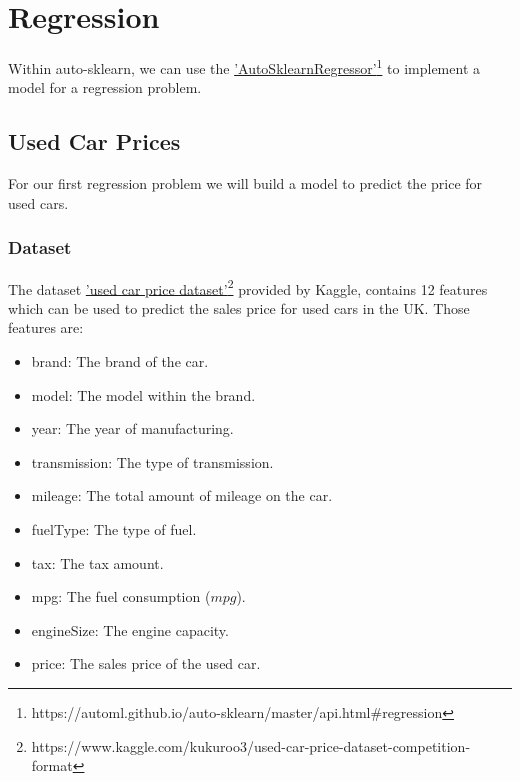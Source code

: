\chapter{Regression}
\newcommand{\linkAutoSklearnRegressor}{https://automl.github.io/auto-sklearn/master/api.html\#regression}

Within auto-sklearn, we can use the \href{\linkAutoSklearnRegressor}{'AutoSklearnRegressor'\footnote{\url{\linkAutoSklearnRegressor}}} to implement a model for a regression problem.

\section{Used Car Prices}
\newcommand{\kagglelinkusedcar}{https://www.kaggle.com/kukuroo3/used-car-price-dataset-competition-format}


For our first regression problem we will build a model to predict the price for used cars.



\subsection{Dataset}

The dataset \href{\kagglelinkusedcar}{'used car price dataset'\footnote{\url{\kagglelinkusedcar}}} provided by Kaggle, contains 12 features which can be used to predict the sales price for used cars in the UK. Those features are:

\begin{itemize}
    \item brand: The brand of the car.
    \item model: The model within the brand.
    \item year: The year of manufacturing.
    \item transmission: The type of transmission.
    \item mileage: The total amount of mileage on the car.
    \item fuelType: The type of fuel.
    \item tax: The tax amount.
    \item mpg: The fuel consumption ($mpg$).
    \item engineSize: The engine capacity.
    \item price: The sales price of the used car.
\end{itemize}

